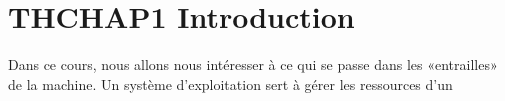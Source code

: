     \tableofcontents
    \clearpage



    
    
    
    
    
    

\section{THCHAP1 Introduction}%
Dans ce cours, nous allons nous intéresser à ce qui se passe dans les «entrailles» de la machine. Un système d’exploitation sert à gérer les ressources d’un

